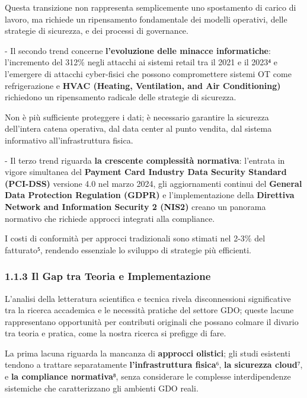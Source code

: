 \documentclass{report}
\begin{document}
Questa transizione non rappresenta semplicemente uno spostamento di
carico di lavoro, ma richiede un ripensamento fondamentale dei modelli
operativi, delle strategie di sicurezza, e dei processi di governance.

- Il secondo trend concerne \textbf{l'evoluzione delle minacce
informatiche}: l'incremento del 312\% negli attacchi ai sistemi retail
tra il 2021 e il 2023⁴ e l'emergere di attacchi cyber-fisici che possono
compromettere sistemi OT come refrigerazione e \textbf{HVAC (Heating,
Ventilation, and Air Conditioning)} richiedono un ripensamento radicale
delle strategie di sicurezza.

Non è più sufficiente proteggere i dati; è necessario garantire la
sicurezza dell'intera catena operativa, dal data center al punto
vendita, dal sistema informativo all'infrastruttura fisica.

- Il terzo trend riguarda \textbf{la crescente complessità normativa}:
l'entrata in vigore simultanea del \textbf{Payment Card Industry Data
Security Standard (PCI-DSS)} versione 4.0 nel marzo 2024, gli
aggiornamenti continui del \textbf{General Data Protection Regulation
(GDPR)} e l'implementazione della \textbf{Direttiva Network and
Information Security 2 (NIS2)} creano un panorama normativo che richiede
approcci integrati alla compliance.

I costi di conformità per approcci tradizionali sono stimati nel 2-3\%
del fatturato⁵, rendendo essenziale lo sviluppo di strategie più
efficienti.

\subsubsection{\texorpdfstring{\textbf{1.1.3 Il Gap tra Teoria e
Implementazione}}{1.1.3 Il Gap tra Teoria e Implementazione}}\label{il-gap-tra-teoria-e-implementazione}

L'analisi della letteratura scientifica e tecnica rivela disconnessioni
significative tra la ricerca accademica e le necessità pratiche del
settore GDO; queste lacune rappresentano opportunità per contributi
originali che possano colmare il divario tra teoria e pratica, come la nostra ricerca si prefigge di fare.

La prima lacuna riguarda la mancanza di \textbf{approcci olistici}; gli studi
esistenti tendono a trattare separatamente \textbf{l'infrastruttura fisica}⁶, \textbf{la
sicurezza cloud}⁷, e \textbf{la compliance normativa}⁸, senza considerare le
complesse interdipendenze sistemiche che caratterizzano gli ambienti GDO
reali.
\end{document}
